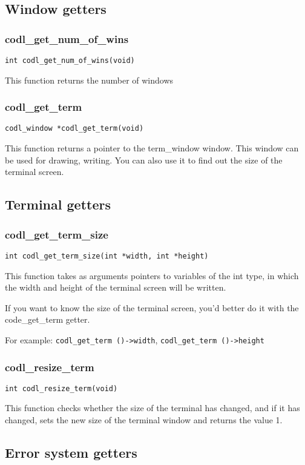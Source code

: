 \documentclass{article}
\newcommand{\fstep}{\vspace{3mm}\noindent}
\begin{document}
\subsection{Window getters}

\subsubsection{codl\_get\_num\_of\_wins}
{\tt int codl\_get\_num\_of\_wins(void)}
              
\fstep{} This function returns the number of windows

\subsubsection{codl\_get\_term}
{\tt codl\_window *codl\_get\_term(void)}

\fstep{} This function returns a pointer to the term\_window window.
This window can be used for drawing, writing. You can also use it to find out
the size of the terminal screen.

\subsection{Terminal getters}

\subsubsection{codl\_get\_term\_size}
{\tt int codl\_get\_term\_size(int *width, int *height)}

\fstep{} This function takes as arguments pointers to variables
of the int type, in which the width and height of the terminal screen will be written.

If you want to know the size of the terminal screen, you'd better do it with
the code\_get\_term getter.

For example: {\tt codl\_get\_term ()->width}, {\tt codl\_get\_term ()->height}

\subsubsection{codl\_resize\_term}
{\tt int codl\_resize\_term(void)}

\fstep{} This function checks whether the size of the terminal has
changed, and if it has changed, sets the new size of the terminal window and
returns the value 1.

\subsection{Error system getters}
\end{document}
